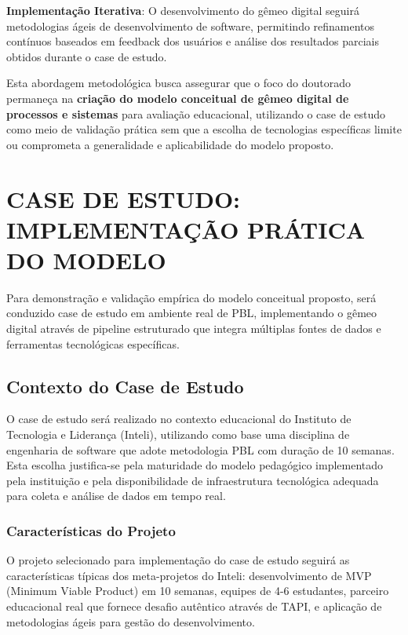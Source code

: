 \documentclass[12pt,a4paper]{article}
\renewcommand{\cite}[1]{}
\begin{document}
\textbf{Implementação Iterativa}: O desenvolvimento do gêmeo digital seguirá metodologias ágeis de desenvolvimento de software, permitindo refinamentos contínuos baseados em feedback dos usuários e análise dos resultados parciais obtidos durante o case de estudo.

Esta abordagem metodológica busca assegurar que o foco do doutorado permaneça
na \textbf{criação do modelo conceitual de gêmeo digital de processos e
  sistemas} para avaliação educacional, utilizando o case de estudo como meio de
validação prática sem que a escolha de tecnologias específicas limite ou
comprometa a generalidade e aplicabilidade do modelo proposto.

\section{CASE DE ESTUDO: IMPLEMENTAÇÃO PRÁTICA DO MODELO}

Para demonstração e validação empírica do modelo conceitual proposto, será
conduzido case de estudo em ambiente real de PBL, implementando o gêmeo digital
através de pipeline estruturado que integra múltiplas
fontes de dados e ferramentas tecnológicas específicas.

\subsection{Contexto do Case de Estudo}

O case de estudo será realizado no contexto educacional do Instituto de
Tecnologia e Liderança (Inteli), utilizando como base uma disciplina de
engenharia de software que adote metodologia PBL com duração de 10 semanas.
Esta escolha justifica-se pela maturidade do modelo pedagógico implementado
pela instituição \cite{inteli2024} e pela disponibilidade de infraestrutura
tecnológica adequada para coleta e análise de dados em tempo real.

\subsubsection{Características do Projeto}

O projeto selecionado para implementação do case de estudo seguirá as
características típicas dos meta-projetos do Inteli: desenvolvimento de MVP
(Minimum Viable Product) em 10 semanas, equipes de 4-6 estudantes, parceiro
educacional real que fornece desafio autêntico através de TAPI, e aplicação de
metodologias ágeis para gestão do desenvolvimento.
\end{document}
